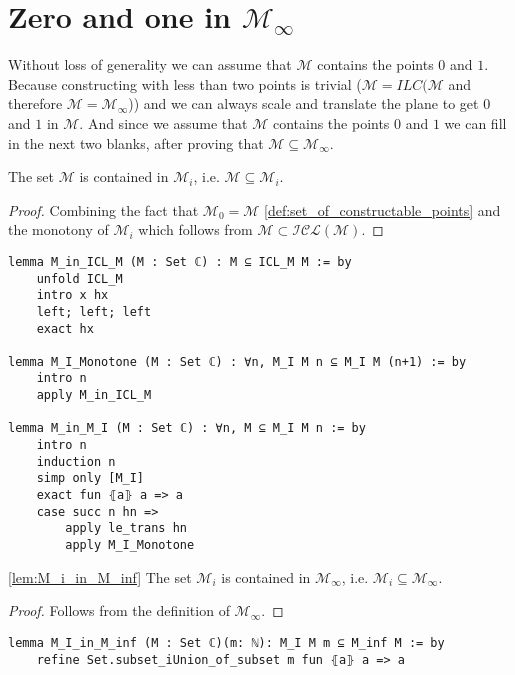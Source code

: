 \section{Zero and one in $\mathcal{M}_{\infty}$}
Without loss of generality we can assume that $\mathcal{M}$ contains the points $0$ and $1$.
Because constructing with less than two points is trivial ($\mathcal{M}=ILC(\mathcal{M}$ and therefore $\mathcal{M}=\mathcal{M}_{\infty}$)) and we can always scale and translate the plane to get $0$ and $1$ in $\mathcal{M}$.
And since we assume that $\mathcal{M}$ contains the points $0$ and $1$ we can fill in the next two blanks, 
after proving that $\mathcal{M} \subseteq \mathcal{M}_{\infty}$.

\begin{lemma}
    \label{lem:M_in_Mi}
    The set $\mathcal{M}$ is contained in $\mathcal{M}_i$, i.e. $\mathcal{M} \subseteq \mathcal{M}_i$.
\end{lemma}
\begin{proof}
    Combining the fact that $\mathcal{M}_0 = \mathcal{M}$ \ref{def:set_of_constructable_points} and the monotony of $\mathcal{M}_i$ which follows from $\mathcal{M} \subset \mathcal{ICL(M)}$.
\end{proof}

\begin{lstlisting}
lemma M_in_ICL_M (M : Set ℂ) : M ⊆ ICL_M M := by
    unfold ICL_M
    intro x hx 
    left; left; left
    exact hx

lemma M_I_Monotone (M : Set ℂ) : ∀n, M_I M n ⊆ M_I M (n+1) := by
    intro n
    apply M_in_ICL_M

lemma M_in_M_I (M : Set ℂ) : ∀n, M ⊆ M_I M n := by
    intro n
    induction n
    simp only [M_I]
    exact fun ⦃a⦄ a => a
    case succ n hn =>
        apply le_trans hn
        apply M_I_Monotone
\end{lstlisting}

\begin{lemma}
    \ref{lem:M_i_in_M_inf}
    The set $\mathcal{M}_i$ is contained in $\mathcal{M}_{\infty}$, i.e. $\mathcal{M}_i \subseteq \mathcal{M}_{\infty}$.
\end{lemma}

\begin{proof}
    Follows from the definition of $\mathcal{M}_{\infty}$.
\end{proof}

\begin{lstlisting}
lemma M_I_in_M_inf (M : Set ℂ)(m: ℕ): M_I M m ⊆ M_inf M := by
    refine Set.subset_iUnion_of_subset m fun ⦃a⦄ a => a
\end{lstlisting}

